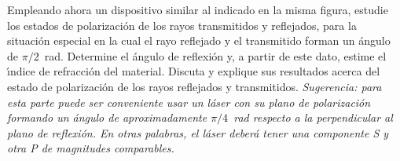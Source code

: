 \documentclass[laboratorio]{guia}
\begin{document}
Empleando ahora un dispositivo similar al indicado en la misma figura, estudie
los estados de polarizaci\'on de los rayos transmitidos y reflejados, para la
situaci\'on especial en la cual el rayo reflejado y el transmitido forman 
un \'angulo de $\pi/2$~rad. Determine el \'angulo de reflexi\'on y, a 
partir de este dato, estime el \'\i ndice de refracci\'on del material. 
Discuta y explique sus resultados acerca del estado de polarizaci\'on de los
rayos reflejados y transmitidos. {\it Sugerencia: para esta parte puede 
ser conveniente usar un l\'aser con su plano de polarizaci\'on formando un
\'angulo de aproximadamente $\pi/4$~rad respecto a la perpendicular al plano
de reflexi\'on. En otras palabras, el l\'aser deber\'a tener una componente
S y otra P de magnitudes comparables. }


\nocite{Alonso1998,Hetch1986,Jenkins2001}
 

\end{document}
